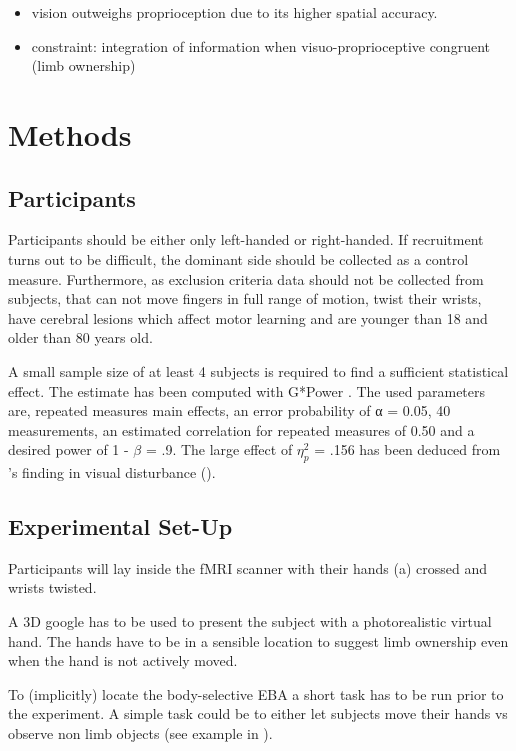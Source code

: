 \documentclass[man]{apa7}
\begin{document}
\begin{itemize}
    \item vision outweighs proprioception due to its higher spatial accuracy.
    \item constraint: integration of information when visuo-proprioceptive congruent (limb ownership)
\end{itemize}

\parencite{Limanowski2016}


\section{Methods}
\subsection{Participants}

Participants should be either only left-handed or right-handed. If recruitment turns out to be difficult, the dominant side should be collected as a control measure. Furthermore, as exclusion criteria data should not be collected from subjects, that can not move fingers in full range of motion, twist their wrists, have cerebral lesions which affect motor learning and are younger than 18 and older than 80 years old.

A small sample size of at least 4 subjects is required to find a sufficient statistical effect. The estimate has been computed with G*Power \parencite{erdfelder1996gpower}. The used parameters are, repeated measures main effects, an error probability of α = 0.05, 40 measurements, an estimated correlation for repeated measures of 0.50 and a desired power of 1 - $\beta$ = .9. The large effect of $\eta^2_p$ = .156 has been deduced from \citeauthor{Wei2009}'s finding in visual disturbance (\citeyear{Wei2009}).

\subsection{Experimental Set-Up}

Participants will lay inside the fMRI scanner with their hands (a) crossed and wrists twisted.

A 3D google has to be used to present the subject with a photorealistic virtual hand. The hands have to be in a sensible location to suggest limb ownership even when the hand is not actively moved.

To (implicitly) locate the body-selective EBA a short task has to be run prior to the experiment. A simple task could be to either let subjects move their hands vs observe non limb objects (see example in \cite{Limanowski2016}).
\end{document}
